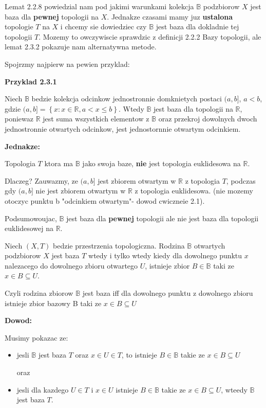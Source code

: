 \documentclass{article}
\begin{document}
Lemat 2.2.8 powiedzial nam pod jakimi warunkami kolekcja $\mathbb{B}$ podzbiorow $X$ jest baza dla \textbf{pewnej} topologii na $X$. Jednakze czasami mamy juz \textbf{ustalona} topologie $T$ na $X$ i chcemy sie dowiedziec czy $\mathbb{B}$ jest baza dla dokladnie tej topologii $T$. Mozemy to owczywiscie sprawdzic z definicji 2.2.2 Bazy topologii, ale lemat 2.3.2 pokazuje nam alternatywna metode.

Spojrzmy najpierw na pewien przyklad:

\textbf{Przyklad 2.3.1}

Niech $\mathbb{B}$ bedzie kolekcja odcinkow jednostronnie domknietych postaci $(a, b]$, $a<b$, gdzie $(a,b] = \left\{ x: x \in \mathbb{R}, a < x \leq b  \right\}$. Wtedy $\mathbb{B}$ jest baza dla topologii na $\mathbb{R}$, poniewaz $\mathbb{R}$ jest suma wszystkich elementow z $\mathbb{B}$ oraz przekroj dowolnych dwoch jednostronnie otwartych odcinkow, jest jednostornnie otwartym odcinkiem. 

\textbf{Jednakze:}

Topologia $T$ ktora ma $\mathbb{B}$ jako swoja baze, \textbf{nie} jest topologia euklidesowa na $\mathbb{R}$.

Dlaczeg? Zauwazmy, ze $(a,b]$ jest zbiorem otwartym w $\mathbb{R}$ z topologia $T$, podczas gdy $(a,b]$ nie jest zbiorem otwartym w $\mathbb{R}$ z topologia euklidesowa. (nie mozemy otoczyc punktu b "odcinkiem otwartym"- dowod cwiczneie 2.1).

Podsumowoujac, $\mathbb{B}$ jest baza dla \textbf{pewnej} topologii ale nie jest baza dla topologii euklidesowej na $\mathbb{R}$.

\begin{tcolorbox}[colback=white!90!green,colframe=black!35!green,title=2.3.2 Lemat Baza topologii podejscie 2?]

    Niech $(X,T)$ bedzie przestrzenia topologiczna. Rodzina $\mathbb{B}$ otwartych podzbiorow $X$ jest baza $T$ wtedy i tylko wtedy kiedy dla dowolnego punktu $x$ nalezacego do dowolnego zbioru otwartego $U$, istnieje zbior $B \in \mathbb{B}$ taki ze $x \in B \subseteq U$.

    Czyli rodzina zbiorow $\mathbb{B}$ jest baza iff dla dowolnego punktu z dowolnego zbioru istnieje zbior bazowy B taki ze $x \in B \subseteq U$
\end{tcolorbox}

\textbf{Dowod:}

Musimy pokazac ze:
\begin{itemize}
    \item jesli $\mathbb{B}$ jest baza $T$ oraz $x \in U \in T$, to istnieje $B \in \mathbb{B}$ takie ze $x \in B \subseteq U$

        oraz
    \item jesli dla kazdego $U \in T$ i $x \in U$ istnieje $B \in \mathbb{B}$ takie ze $x \in B \subseteq U$, wteedy $\mathbb{B}$ jest baza $T$.
\end{itemize}
\end{document}
